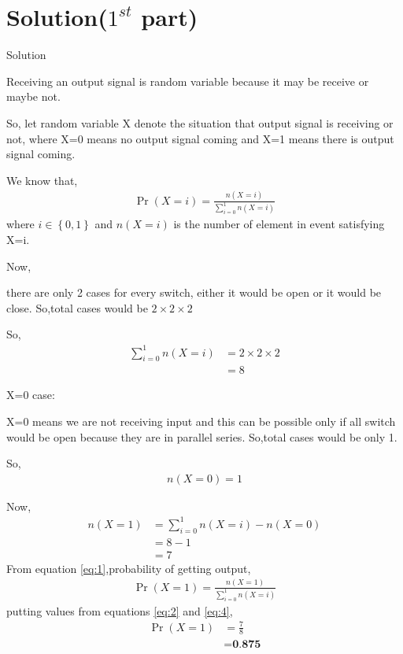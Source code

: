 \documentclass{beamer}
\providecommand{\brak}[1]{\ensuremath{\left(#1\right)}}
\providecommand{\cbrak}[1]{\ensuremath{\left\{#1\right\}}}
\begin{document}
\section{Solution($1^{st}$ part)}
\begin{frame}{Solution}
    


Receiving an output signal is random variable because it may be receive or maybe not.

So,
let random variable X denote the situation that output signal is receiving or not, where X=0 means no output signal coming and X=1 means there is output signal coming.

We know that,
\begin{align}
\label{eq:1}
\Pr\brak{X = i} = \frac{n\brak{X = i}}{\sum_{i=0}^1 n\brak{X = i}}
\end{align}
where $i\in\cbrak{{0,1}}$ and $n\brak{X = i}$ is the number of element in event satisfying X=i.
\end{frame}
\begin{frame}
    

Now,

there are only 2 cases for every switch, either it would be open or it would be close.
So,total cases would be $2\times2\times2$

So,
\begin{align}
\label{eq:2}
\sum_{i=0}^1 n\brak{X = i}&=2\times2\times2 \nonumber \\
&=8
\end{align}

X=0 case:

X=0 means we are not receiving input and this can be possible only if  all switch would be open because they are in parallel series.
So,total cases would be only 1.

So,
\begin{align}
\label{eq:3}
n\brak{X = 0}=1  
\end{align}
\end{frame}
\begin{frame}
    
Now,
\begin{align}
\label{eq:4}
    n\brak{X = 1}&=\sum_{i=0}^1 n\brak{X = i}-n\brak{X = 0}  \nonumber\\
    &=8-1    \nonumber \\
    &=7
\end{align}
From equation \eqref{eq:1},probability of getting output,
\begin{align}
\Pr\brak{X = 1} = \frac{n\brak{X = 1}}{\sum_{i=0}^1 n\brak{X = i}}                                  \nonumber
\end{align}
putting values from equations \eqref{eq:2} and \eqref{eq:4},
\begin{align}
\Pr\brak{X = 1}&=\frac{7}{8}         \nonumber\\
&=\textbf{0.875}      \nonumber
\end{align}

\end{frame}
\end{document}
